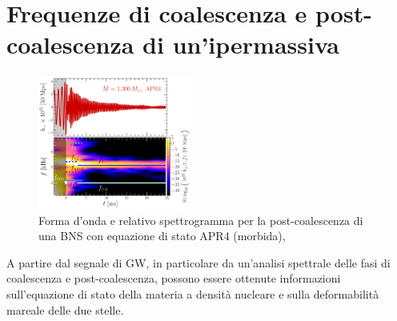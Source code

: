 \section[Frequenze caratteristiche]{Frequenze  di coalescenza e post-coalescenza di un'ipermassiva}
\label{section:frequenze_caratteristiche}
\begin{figure}
	\vspace{-5pt}
	\begin{center}
		\includegraphics[width=0.45\textwidth]{figures/Capitolo_1/GW_spectrogram_APR4-q10-M1300.pdf}
	\end{center}
	\vspace{-10pt}
	\caption{Forma d'onda e relativo spettrogramma per la post-coalescenza di una BNS con equazione di stato APR4 (morbida), \cite{Rezzolla_2016}}
	\label{fig:spettrogramma_postmerger_APR4}
	\vspace{-10pt}
\end{figure}
A partire dal segnale di GW, in particolare da un'analisi spettrale delle fasi di coalescenza e post-coalescenza, possono essere ottenute informazioni sull'equazione di stato della materia a densità nucleare e sulla deformabilità mareale delle due stelle.\\
